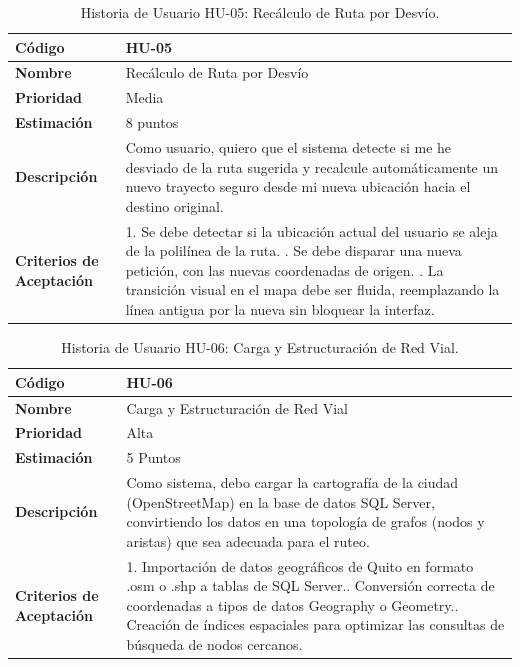 \begin{table}[H]
\caption{Historia de Usuario HU-05: Recálculo de Ruta por Desvío.}
\label{tab:historias-usuario-5}
\centering
\begin{tabular}{|p{4cm}|p{10cm}|}
\hline
\textbf{Código} & HU-05 \\ \hline
\textbf{Nombre} & Recálculo de Ruta por Desvío \\ \hline
\textbf{Prioridad} & Media \\ \hline
\textbf{Estimación} & 8 puntos \\ \hline
\textbf{Descripción} &
Como usuario, quiero que el sistema detecte si me he desviado de la ruta sugerida y recalcule automáticamente un nuevo trayecto seguro desde mi nueva ubicación hacia el destino original. \\ \hline
\textbf{Criterios de Aceptación} &
1. Se debe detectar si la ubicación actual del usuario se aleja de la polilínea de la ruta. \newline
2. Se debe disparar una nueva petición, con las nuevas coordenadas de origen. \newline
3. La transición visual en el mapa debe ser fluida, reemplazando la línea antigua por la nueva sin bloquear la interfaz. \\ \hline
\end{tabular}
\end{table}

\begin{table}[H]
\caption{Historia de Usuario HU-06: Carga y Estructuración de Red Vial.}
\label{tab:historias-usuario-6}
\centering
\begin{tabular}{|p{4cm}|p{10cm}|}
\hline
\textbf{Código} & HU-06 \\ \hline
\textbf{Nombre} & Carga y Estructuración de Red Vial\\ \hline
\textbf{Prioridad} & Alta \\ \hline
\textbf{Estimación} & 5 Puntos \\ \hline
\textbf{Descripción} &
Como sistema, debo cargar la cartografía de la ciudad (OpenStreetMap) en la base de datos SQL Server, convirtiendo los datos en una topología de grafos (nodos y aristas) que sea adecuada para el ruteo. \\ \hline
\textbf{Criterios de Aceptación} &
1. Importación de datos geográficos de Quito en formato .osm o .shp a tablas de SQL Server.\newline
2. Conversión correcta de coordenadas a tipos de datos Geography o Geometry.\newline
3. Creación de índices espaciales para optimizar las consultas de búsqueda de nodos cercanos. \\ \hline
\end{tabular}
\end{table}


